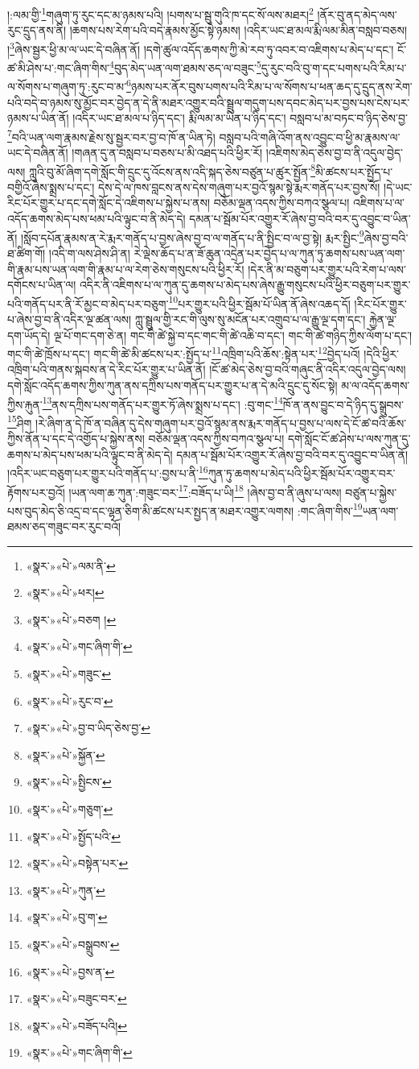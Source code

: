།:ལམ་གྱི་\footnote{«སྣར་»«པེ་»ལམ་ནི་}གཞུག་ཏུ་རུང་དང་མ་ཉམས་པའི། །པགས་པ་སྦུ་གུའི་ཁ་དང་སོ་ལས་མཐར།\footnote{«སྣར་»«པེ་»ཕར།} །ནོར་བུ་ནད་མེད་ལས་རུང་དྲུད་ནས་ནི། །ཆགས་པས་རེག་པའི་བདེ་རྣམས་མྱོང་སྟེ་ཉམས། །འདིར་ཡང་ཐ་མལ་རྨི་ལམ་མིན་བསླབ་བཅས། །\footnote{«སྣར་»«པེ་»བཅག །}ཞེས་སྦྱར་ཕྱི་མ་ལ་ཡང་དེ་བཞིན་ནོ། །དགེ་ཚུལ་འདོད་ཆགས་ཀྱི་མེ་རབ་ཏུ་འབར་བ་འཇིགས་པ་མེད་པ་དང་། ངོ་ཚ་མི་ཤེས་པ་:གང་ཞིག་གིས་\footnote{«སྣར་»«པེ་»གང་ཞིག་གི་}བུད་མེད་ཡན་ལག་ཐམས་ཅད་ལ་བཟུང་\footnote{«སྣར་»«པེ་»གཟུང་}དུ་རུང་བའི་བུ་ག་དང་པགས་པའི་རིམ་པ་ལ་སོགས་པ་གཞུག་ཏུ་:རུང་བ་མ་\footnote{«སྣར་»«པེ་»རུང་བ་}ཉམས་པར་ནོར་བུས་པགས་པའི་རིམ་པ་ལ་སོགས་པ་ཕན་ཆད་དུ་དྲུད་ནས་རེག་པའི་བདེ་བ་ཉམས་སུ་མྱོང་བར་བྱེད་ན་དེ་ནི་མཐར་འགྱུར་བའི་སྦྲུལ་གདུག་པས་དབང་མེད་པར་བྱས་པས་ངེས་པར་ཉམས་པ་ཡིན་ནོ། །འདིར་ཡང་ཐ་མལ་པ་ཉིད་དང་། རྨི་ལམ་མ་ཡིན་པ་ཉིད་དང་། བསླབ་པ་མ་བཏང་བ་ཉིད་ཅེས་བྱ་\footnote{«སྣར་»«པེ་»བྱ་བ་ཡིད་ཅེས་བྱ་}བའི་ཡན་ལག་རྣམས་རྗེས་སུ་སྦྱར་བར་བྱ་བ་ཁོ་ན་ཡིན་ཏེ། བསླབ་པའི་གཞི་འོག་ནས་འབྱུང་བ་ཕྱི་མ་རྣམས་ལ་ཡང་དེ་བཞིན་ནོ། །གཞན་དུ་ན་བསླབ་པ་བཅས་པ་མི་འཐད་པའི་ཕྱིར་རོ། །འཇིགས་མེད་ཅེས་བྱ་བ་ནི་འདུལ་བྱེད་ལས། ཀླུའི་བུ་མོ་ཞིག་དགེ་སློང་གི་དྲུང་དུ་འོངས་ནས་འདི་སྐད་ཅེས་བཙུན་པ་ཚུར་སྤྱོན་\footnote{«སྣར་»«པེ་»སྐྱོན་}མི་ཚངས་པར་སྤྱོད་པ་བགྱིའོ་ཞེས་སྨྲས་པ་དང་། དེས་དེ་ལ་ཁས་བླངས་ནས་དེས་གཞུག་པར་བྱའོ་སྙམ་སྟེ་རྨར་གནོད་པར་བྱས་སོ། །དེ་ཡང་རིང་པོར་གྱུར་པ་དང་དགེ་སློང་དེ་འཇིགས་པ་སྐྱེས་པ་ནས། བཅོམ་ལྡན་འདས་ཀྱིས་བཀའ་སྩལ་པ། འཇིགས་པ་ལ་འདོད་ཆགས་མེད་པས་ཕམ་པའི་ལྟུང་བ་ནི་མེད་དེ། དམན་པ་སྦོམ་པོར་འགྱུར་རོ་ཞེས་བྱ་བའི་བར་དུ་འབྱུང་བ་ཡིན་ནོ། །སློབ་དཔོན་རྣམས་ན་རེ་རྨར་གནོད་པ་བྱས་ཞེས་བྱ་བ་ལ་གནོད་པ་ནི་སྤྱིང་བ་ལ་བྱ་སྟེ། རྨར་སྤྱིང་\footnote{«སྣར་»«པེ་»སྤྱིངས་}ཞེས་བྱ་བའི་ཐ་ཚིག་གོ། །འདི་ག་ལས་ཤེས་ཤི་ན། རེ་ལྡེས་ཆོད་པ་ན་ཟོ་ཆུན་འདྲེན་པར་བྱེད་པ་ལ་ཀུན་ཏུ་ཆགས་པས་ཡན་ལག་གི་རྣམ་པས་ཡན་ལག་གི་རྣམ་པ་ལ་རེག་ཅེས་གསུངས་པའི་ཕྱིར་རོ། །དེར་ནི་མ་བཅུག་པར་གྱུར་པའི་རེག་པ་ལས་དགོངས་པ་ཡིན་ལ། འདིར་ནི་འཇིགས་པ་ལ་ཀུན་དུ་ཆགས་པ་མེད་པས་ཞེས་རྒྱུ་གསུངས་པའི་ཕྱིར་བཅུག་པར་གྱུར་པའི་གནོད་པར་ནི་རོ་མྱང་བ་མེད་པར་བཅུག་\footnote{«སྣར་»«པེ་»གཅུག་}པར་གྱུར་པའི་ཕྱིར་སྦོམ་པོ་ཡིན་ནོ་ཞེས་འཆད་དོ། །རིང་པོར་གྱུར་པ་ཞེས་བྱ་བ་ནི་འདིར་ལྔ་ཚན་ལས། ཀླུ་སྦྲུལ་གྱི་རང་གི་ལུས་སུ་མངོན་པར་འགྲུབ་པ་ལ་རྒྱུ་ལྔ་དག་དང་། རྐྱེན་ལྔ་དག་ཡོད་དེ། ལྔ་པོ་གང་དག་ཅེ་ན། གང་གི་ཚེ་སྐྱེ་བ་དང་གང་གི་ཚེ་འཆི་བ་དང་། གང་གི་ཚེ་གཉིད་ཀྱིས་ལོག་པ་དང་། གང་གི་ཚེ་ཁྲོས་པ་དང་། གང་གི་ཚེ་མི་ཚངས་པར་:སྤྱོད་པ་\footnote{«སྣར་»«པེ་»སྤྱོད་པའི་}འཁྲིག་པའི་ཆོས་:སྟེན་པར་\footnote{«སྣར་»«པེ་»བསྟེན་པར་}བྱེད་པའོ། །དེའི་ཕྱིར་འཁྲིག་པའི་གནས་སྐབས་ན་དེ་རིང་པོར་གྱུར་པ་ཡིན་ནོ། །ངོ་ཚ་མེད་ཅེས་བྱ་བའི་གཞུང་ནི་འདིར་འདུལ་བྱེད་ལས། དགེ་སློང་འདོད་ཆགས་ཀྱིས་ཀུན་ནས་དཀྲིས་པས་གནོད་པར་གྱུར་པ་ན་དེ་མའི་དྲུང་དུ་སོང་སྟེ། མ་ལ་འདོད་ཆགས་ཀྱིས་རྐུན་\footnote{«སྣར་»«པེ་»ཀུན་}ནས་དཀྲིས་པས་གནོད་པར་གྱུར་ཏོ་ཞེས་སྨྲས་པ་དང་། :བུ་གང་\footnote{«སྣར་»«པེ་»བུ་ག་}ཁོ་ན་ནས་བྱུང་བ་དེ་ཉིད་དུ་སྒྲུབས་\footnote{«སྣར་»«པེ་»བསྒྲུབས་}ཤིག །རེ་ཞིག་ན་དེ་ཁོ་ན་བཞིན་དུ་དེས་གཞུག་པར་བྱའོ་སྙམ་ནས་རྨར་གནོད་པ་བྱས་པ་ལས་དེ་ངོ་ཚ་བའི་ཆོས་ཀྱིས་ནོན་པ་དང་དེ་འགྱོད་པ་སྐྱེས་ནས། བཅོམ་ལྡན་འདས་ཀྱིས་བཀའ་སྩལ་པ། དགེ་སློང་ངོ་ཚ་ཤེས་པ་ལས་ཀུན་དུ་ཆགས་པ་མེད་པས་ཕམ་པའི་ལྟུང་བ་ནི་མེད་དེ། དམན་པ་སྦོམ་པོར་འགྱུར་རོ་ཞེས་བྱ་བའི་བར་དུ་འབྱུང་བ་ཡིན་ནོ། །འདིར་ཡང་བཅུག་པར་གྱུར་པའི་གནོད་པ་:བྱས་པ་ནི་\footnote{«སྣར་»«པེ་»བྱས་ན་}ཀུན་ཏུ་ཆགས་པ་མེད་པའི་ཕྱིར་སྦོམ་པོར་འགྱུར་བར་རྟོགས་པར་བྱའོ། །ཡན་ལག་ཆ་ཀུན་:གཟུང་བར་\footnote{«སྣར་»«པེ་»བཟུང་བར་}:བཟོད་པ་ཡི།\footnote{«སྣར་»«པེ་»བཟོད་པའི།} །ཞེས་བྱ་བ་ནི་ཞུས་པ་ལས། བཙུན་པ་སྐྱེས་པས་བུད་མེད་ཅི་འདྲ་བ་དང་ལྷན་ཅིག་མི་ཚངས་པར་སྤྱད་ན་མཐར་འགྱུར་ལགས། :གང་ཞིག་གིས་\footnote{«སྣར་»«པེ་»གང་ཞིག་གི་}ཡན་ལག་ཐམས་ཅད་གཟུང་བར་རུང་བའོ། 